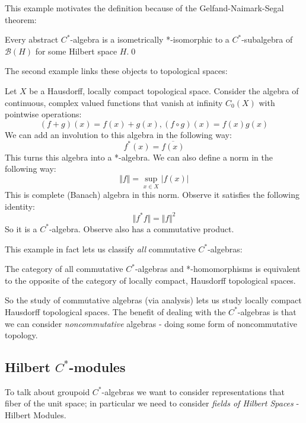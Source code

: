 This example motivates the definition because of the Gelfand-Naimark-Segal theorem:

\begin{theorem}
Every abstract $C^{*}$-algebra is a isometrically *-isomorphic to a $C^{*}$-subalgebra of $\mathcal{B}(H)$ for some Hilbert space $H$.\qed
\end{theorem}

The second example links these objects to topological spaces:

\begin{example}
Let $X$ be a Hausdorff, locally compact topological space. Consider the algebra of continuous, complex valued functions that vanish at infinity $C_{0}(X)$ with pointwise operations:
\begin{equation*}
(f+g)(x)=f(x)+g(x), (f\circ g)(x)=f(x)g(x)
\end{equation*}
We can add an involution to this algebra in the following way:
\begin{equation*}
f^{*}(x)=\overline{f(x)}
\end{equation*}
This turns this algebra into a *-algebra. We can also define a norm in the following way:
\begin{equation*}
\Vert f \Vert = \sup_{x \in X} \vert f(x) \vert
\end{equation*}
This is complete (Banach) algebra in this norm. Observe it satisfies the following identity:
\begin{equation*}
\Vert f^{*}f \Vert = \Vert f \Vert^{2}
\end{equation*}
So it is a $C^{*}$-algebra. Observe also has a commutative product.
\end{example}

This example in fact lets us classify \textit{all} commutative $C^{*}$-algebras:

\begin{theorem}
The category of all commutative $C^{*}$-algebras and *-homomorphisms is equivalent to the opposite of the category of locally compact, Hausdorff topological spaces.
\end{theorem}

So the study of commutative algebras (via analysis) lets us study locally compact Hausdorff topological spaces. The benefit of dealing with the $C^{*}$-algebras is that we can consider \textit{noncommutative} algebras - doing some form of noncommutative topology.

\subsection{Hilbert $C^{*}$-modules}
To talk about groupoid $C^{*}$-algebras we want to consider representations that fiber of the unit space; in particular we need to consider \textit{fields of Hilbert Spaces} - Hilbert Modules.

